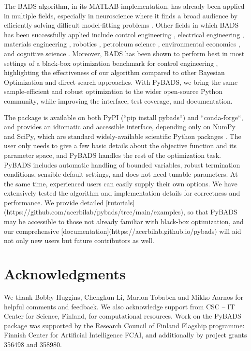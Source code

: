 \documentclass[
]{article}
\begin{document}
The BADS algorithm, in its MATLAB implementation, has already been applied in multiple fields, especially in neuroscience where it finds a broad audience by efficiently solving difficult model-fitting problems \parencite{cao2019causal, Tajima2019, Li2020, DAUBE20191924}. Other fields in which BADS has been successfully applied include control engineering \parencite{stenger2022benchmark}, electrical engineering \parencite{li2022topology}, materials engineering \parencite{ren2021novel}, robotics \parencite{REN2020575}, petroleum science \parencite{FENG20222879}, environmental economics \parencite{nobel2020}, and cognitive science \parencite{STENGARD2022105160, vanOpheusden2023}. Moreover, BADS has been shown to perform best in most settings of a black-box optimization benchmark for control engineering \parencite{stenger2022benchmark}, highlighting the effectiveness of our algorithm compared to other Bayesian Optimization and direct-search approaches.
With PyBADS, we bring the same sample-efficient and robust optimization to the wider open-source Python community, while improving the interface, test coverage, and documentation.

The package is available on both PyPI (``pip install pybads``) and ``conda-forge``, and provides an idiomatic and accessible interface, depending only on NumPy and SciPy, which are standard widely-available scientific Python packages \cite{harris_array_2020, scipy-2020}. The user only needs to give a few basic details about the objective function and its parameter space, and PyBADS handles the rest of the optimization task. PyBADS includes automatic handling of bounded variables, robust termination conditions, sensible default settings, and does not need tunable parameters. At the same time, experienced users can easily supply their own options. We have extensively tested the algorithm and implementation details for correctness and performance. We provide detailed [tutorials](https://github.com/acerbilab/pybads/tree/main/examples), so that PyBADS may be accessible to those not already familiar with black-box optimization, and our comprehensive [documentation](https://acerbilab.github.io/pybads) will aid not only new users but future contributors as well.

\hypertarget{acknowledgments}{%
\section{Acknowledgments}\label{acknowledgments}}

We thank Bobby Huggins, Chengkun Li, Marlon Tobaben and Mikko Aarnos for helpful comments and feedback.
We also acknowledge support from CSC – IT Center for Science, Finland, for computational resources.
Work on the PyBADS package was supported by the Research Council of Finland Flagship programme: Finnish Center for Artificial Intelligence FCAI, and additionally by project grants 356498 and 358980.

\newrefcontext[sorting=nyt]
\printbibliography
\end{document}
